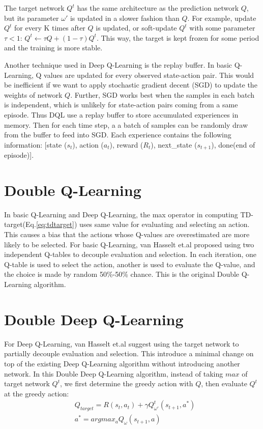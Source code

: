 \documentclass[conference]{IEEEtran}
\begin{document}
The target network $Q^t$ has the same architecture as the prediction network $Q$, but its parameter $\omega'$ is updated in a slower fashion than $Q$. For example, update $Q^t$ for every K times after $Q$ is updated, or soft-update $Q^t$ with some parameter $\tau<1$:
$Q^t \leftarrow \tau Q + (1-\tau) Q^t$. This way, the target is kept frozen for some period and the training is more stable.

Another technique used in Deep Q-Learning is the replay buffer. In basic Q-Learning, Q values are updated for every observed state-action pair. This would be inefficient if we want to apply stochastic gradient decent (SGD) to update the weights of network $Q$. Further, SGD works best when the samples in each batch is independent, which is unlikely for state-action pairs coming from a same episode. Thus DQL use a replay buffer to store accumulated experiences in memory. Then for each time step, a a batch of samples can be randomly draw from the buffer to feed into SGD. Each experience contains the following information: [state ($s_t$), action ($a_t$), reward ($R_t$), next\_state ($s_{t+1}$), done(end of episode)].

\section{Double Q-Learning}
In basic Q-Learning and Deep Q-Learning, the max operator in computing TD-target(Eq.\ref{eq:tdtarget})  uses same value for evaluating and selecting an action. This causes a bias that the actions whose Q-values are overestimated are more likely to be selected. For basic Q-Learning, van Hasselt et.al proposed using two independent Q-tables to decouple evaluation and selection. In each iteration, one Q-table is used to select the action, another is used to evaluate the Q-value, and the choice is made by random 50\%-50\% chance. This is the original Double Q-Learning algorithm.

\section{Double Deep Q-Learning}
For Deep Q-Learning, van Hasselt et.al suggest using the target network to partially decouple evaluation and selection. This introduce a minimal change on top of the existing Deep Q-Learning algorithm without introducing another network. In this Double Deep Q-Learning algorithm, instead of taking $max$ of target network $Q^t$, we first determine the greedy action with $Q$, then evaluate $Q^t$ at the greedy action:
\begin{align}
& Q_{target} = R(s_t, a_t) + \gamma Q^t_{\omega'}(s_{t+1}, a^*) \\
& a^* = argmax_a Q_\omega(s_{t+1}, a)
\end{align}
\end{document}

